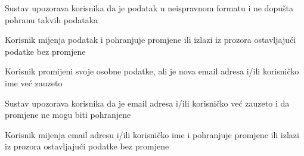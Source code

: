 \begin{packed_item}
\begin{packed_item}
\begin{packed_enum}
						\item Sustav upozorava korisnika da je podatak u neispravnom formatu i ne dopušta pohranu takvih podataka
						\item Korisnik mijenja podatak i pohranjuje promjene ili izlazi iz prozora ostavljajući podatke bez promjene
					\end{packed_enum}
					
						\item [6.b]  Korisnik promijeni svoje osobne podatke, ali je nova email adresa i/ili korisničko ime već zauzeto
					\item[] \begin{packed_enum}
						
						\item Sustav upozorava korisnika da je email adresa i/ili korisničko već zauzeto i da promjene ne mogu biti pohranjene
						\item Korisnik mijenja email adresu i/ili korisničko ime i pohranjuje promjene ili izlazi iz prozora ostavljajući podatke bez promjene
					\end{packed_enum}
				\end{packed_item}
			\end{packed_item}
		
